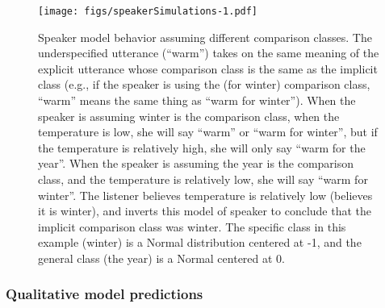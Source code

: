 \documentclass[doc]{apa6}
\begin{document}
\begin{figure}
\centering
\texttt{[image: figs/speakerSimulations-1.pdf]}
\caption{\label{fig:speakerSimulations}Speaker model behavior assuming
different comparison classes. The underspecified utterance
(``warm'') takes on the same meaning of the explicit utterance
whose comparison class is the same as the implicit class (e.g., if the
speaker is using the (for winter) comparison class, ``warm'' means
the same thing as ``warm for winter''). When the speaker is
assuming winter is the comparison class, when the temperature is low, she
will say ``warm'' or ``warm for winter'', but if the
temperature is relatively high, she will only say ``warm for the
year''. When the speaker is assuming the year is the comparison class,
and the temperature is relatively low, she will say ``warm for
winter''. The listener believes temperature is relatively low (believes
it is winter), and inverts this model of speaker to conclude that the
implicit comparison class was winter. The specific class in this example
(winter) is a Normal distribution centered at -1, and the general class
(the year) is a Normal centered at 0.}
\end{figure}

\subsubsection{Qualitative model
predictions}
\end{document}
